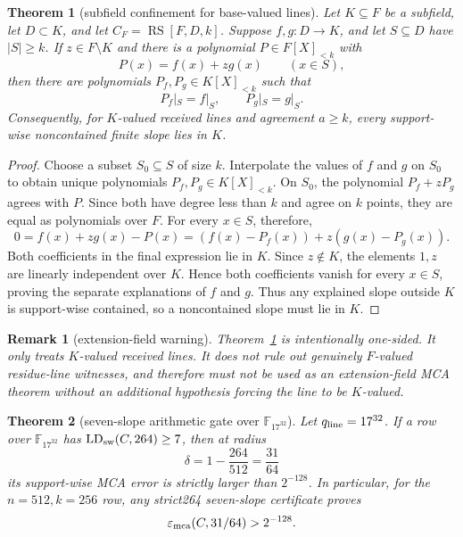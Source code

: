 \documentclass[11pt]{article}
\newtheorem{theorem}{Theorem}
\newtheorem{remark}{Remark}
\newcommand{\F}{\mathbb F}
\newcommand{\RS}{\operatorname{RS}}
\newcommand{\qline}{q_{\rm line}}
\begin{document}
\begin{theorem}[subfield confinement for base-valued lines]
\label{thm:subfield-confinement-base-lines}
Let \(K\subseteq F\) be a subfield, let \(D\subset K\), and let
\(C_F=\RS[F,D,k]\).  Suppose \(f,g:D\to K\), and let
\(S\subseteq D\) have \(|S|\ge k\).  If \(z\in F\setminus K\) and there is a
polynomial \(P\in F[X]_{<k}\) with
\[
  P(x)=f(x)+zg(x)
  \qquad (x\in S),
\]
then there are polynomials \(P_f,P_g\in K[X]_{<k}\) such that
\[
  P_f|_S=f|_S,
  \qquad
  P_g|_S=g|_S.
\]
Consequently, for \(K\)-valued received lines and agreement \(a\ge k\), every
support-wise noncontained finite slope lies in \(K\).
\end{theorem}

\begin{proof}
Choose a subset \(S_0\subseteq S\) of size \(k\).  Interpolate the values of
\(f\) and \(g\) on \(S_0\) to obtain unique polynomials
\(P_f,P_g\in K[X]_{<k}\).  On \(S_0\), the polynomial
\(P_f+zP_g\) agrees with \(P\).  Since both have degree less than \(k\) and agree
on \(k\) points, they are equal as polynomials over \(F\).  For every
\(x\in S\), therefore,
\[
  0=f(x)+zg(x)-P(x)
   =(f(x)-P_f(x))+z(g(x)-P_g(x)).
\]
Both coefficients in the final expression lie in \(K\).  Since
\(z\notin K\), the elements \(1,z\) are linearly independent over \(K\).  Hence
both coefficients vanish for every \(x\in S\), proving the separate explanations
of \(f\) and \(g\).  Thus any explained slope outside \(K\) is support-wise
contained, so a noncontained slope must lie in \(K\).
\end{proof}

\begin{remark}[extension-field warning]
Theorem~\ref{thm:subfield-confinement-base-lines} is intentionally one-sided.
It only treats \(K\)-valued received lines.  It does not rule out genuinely
\(F\)-valued residue-line witnesses, and therefore must not be used as an
extension-field MCA theorem without an additional hypothesis forcing the line to
be \(K\)-valued.
\end{remark}

\begin{theorem}[seven-slope arithmetic gate over \(\F_{17^{32}}\)]
\label{thm:seven-slope-arithmetic-gate}
Let \(\qline=17^{32}\).  If a row over \(\F_{17^{32}}\) has
\(\operatorname{LD}_{\rm sw}(C,264)\ge7\), then at radius
\[
  \delta=1-\frac{264}{512}=\frac{31}{64}
\]
its support-wise MCA error is strictly larger than \(2^{-128}\).  In particular,
for the \(n=512,k=256\) row, any strict264 seven-slope certificate proves
\[
  \varepsilon_{\rm mca}(C,31/64)>2^{-128}.
\]
\end{theorem}
\end{document}
